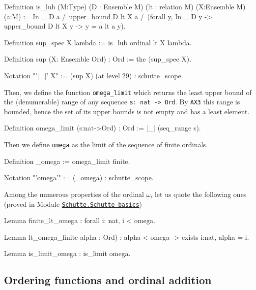 {\begin{Coqsrc}
Definition is_lub (M:Type)
                  (D : Ensemble M)
                  (lt : relation M)
                  (X:Ensemble M)
                  (a:M) :=
   In _ D a  /\ upper_bound  D lt X a  /\
   (forall y, In _ D y -> upper_bound  D lt X y  -> 
                  y = a \/ lt a y).
\end{Coqsrc}


\begin{Coqsrc}
Definition sup_spec X lambda := is_lub ordinal lt X lambda.

Definition sup (X: Ensemble Ord) : Ord  := the  (sup_spec X).

Notation "'|_|' X" := (sup X) (at level 29) : schutte_scope.
\end{Coqsrc}



Then, we define the function \texttt{omega\_limit} which returns the least upper bound 
of the  (denumerable) range of any sequence \texttt{s: nat -> Ord}. 
By \texttt{AX3} this range is bounded, hence the set of its upper bounds is not empty and has a least element.


\begin{Coqsrc}
Definition omega_limit (s:nat->Ord) : Ord 
  := |_| (seq_range s).
\end{Coqsrc}

Then we define \texttt{omega} as the limit of the sequence of finite ordinals.


\label{sect:notation-omega}
\begin{Coqsrc}
Definition _omega := omega_limit finite.

Notation "'omega'" := (_omega) : schutte_scope.
\end{Coqsrc}



Among the numerous properties of the ordinal $\omega$, let us quote the following ones
(proved in Module 
\href{../theories/html/hydras.Schutte.Schutte_basics.html\#finite_lt_omega}{\texttt{Schutte.Schutte\_basics}})

\begin{Coqsrc}
Lemma finite_lt_omega : forall i: nat,  i < omega.

Lemma lt_omega_finite alpha : Ord) : 
  alpha < omega ->  exists i:nat, alpha =  i.

Lemma is_limit_omega : is_limit omega.
\end{Coqsrc}


\subsection{Ordering functions and ordinal addition}

}
